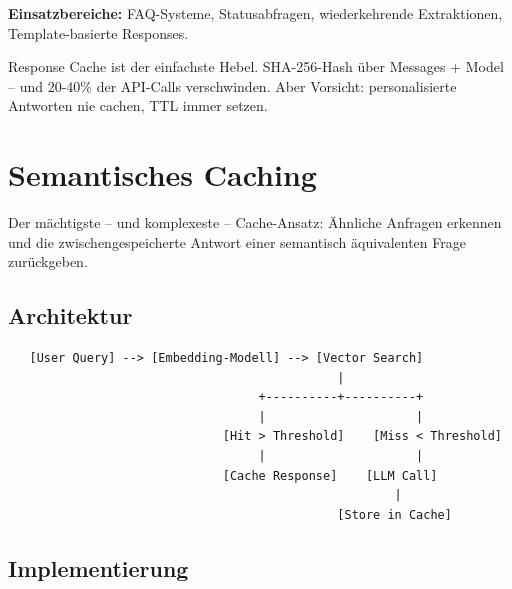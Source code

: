 \textbf{Einsatzbereiche:} FAQ-Systeme, Statusabfragen, wiederkehrende Extraktionen, Template-basierte Responses.

\begin{praxishinweis}
Response Cache ist der einfachste Hebel. SHA-256-Hash über Messages + Model -- und 20-40\% der API-Calls verschwinden. Aber Vorsicht: personalisierte Antworten nie cachen, TTL immer setzen.
\end{praxishinweis}

\section{Semantisches Caching}

Der mächtigste -- und komplexeste -- Cache-Ansatz: Ähnliche Anfragen erkennen und die zwischengespeicherte Antwort einer semantisch äquivalenten Frage zurückgeben.

\subsection{Architektur}

\begin{verbatim}
   [User Query] --> [Embedding-Modell] --> [Vector Search]
                                              |
                                   +----------+----------+
                                   |                     |
                              [Hit > Threshold]    [Miss < Threshold]
                                   |                     |
                              [Cache Response]    [LLM Call]
                                                      |
                                              [Store in Cache]
\end{verbatim}

\subsection{Implementierung}

